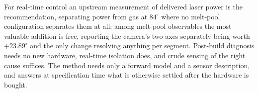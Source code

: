 \documentclass[preprint,times]{elsarticle}
\begin{document}
For real-time control an upstream measurement of delivered laser power is the
recommendation, separating power from gas at $84^\circ$ where no melt-pool
configuration separates them at all; among melt-pool observables the most
valuable addition is free, reporting the camera's two axes separately being worth
$+23.89^\circ$ and the only change resolving anything per segment. Post-build
diagnosis needs no new hardware, real-time isolation does, and crude sensing of
the right cause suffices. The method needs only a forward model and a sensor
description, and answers at specification time what is otherwise settled after
the hardware is bought.

\end{document}
